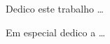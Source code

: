 \begin{dedicatoria}
  Dedico este trabalho \ldots

  Em especial dedico a \ldots 
\end{dedicatoria}
